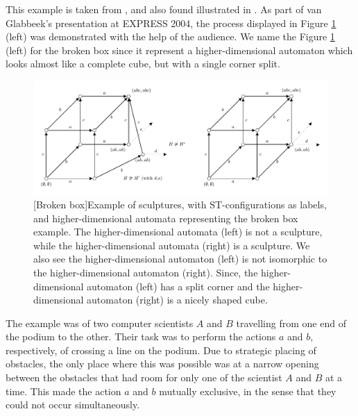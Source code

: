     \begin{example}\label{exp:hda-broken-box}
        This example is taken from \cite[Section 9.2.1]{Glabbeek06HDA}, and also found illustrated in \cite[Figure 6]{Johansen16STstruct}. As part of van Glabbeek's presentation at EXPRESS 2004, the process displayed in Figure \ref{fig:HDA-broken-box} (left) was demonstrated with the help of the audience. We name the Figure \ref{fig:HDA-broken-box} (left) for the broken box since it represent a higher-dimensional automaton which looks almost like a complete cube, but with a single corner split.
    
        \begin{figure}[ht]
            \centering
            \includegraphics[scale=0.9]{Figures/5.Relationship-with-other-models-of-true-concurrency/broken_box(figure_6_left)/HDA-broken-box.pdf}
            [Broken box]{Example of sculptures, with ST-configurations as labels, and higher-dimensional automata representing the broken box example. The higher-dimensional automata (left) is not a sculpture, while the higher-dimensional automata (right) is a sculpture. We also see the higher-dimensional automaton (left) is not isomorphic to the higher-dimensional automaton (right). Since, the higher-dimensional automaton (left) has a split corner and the higher-dimensional automaton (right) is a nicely shaped cube.}
            \label{fig:HDA-broken-box}
        \end{figure}
    
        The example was of two computer scientists $A$ and $B$ travelling from one end of the podium to the other. Their task was to perform the actions $a$ and $b$, respectively, of crossing a line on the podium. Due to strategic placing of obstacles, the only place where this was possible was at a narrow opening between the obstacles that had room for only one of the scientist $A$ and $B$ at a time. This made the action $a$ and $b$ mutually exclusive, in the sense that they could not occur simultaneously.
    

\end{example}
